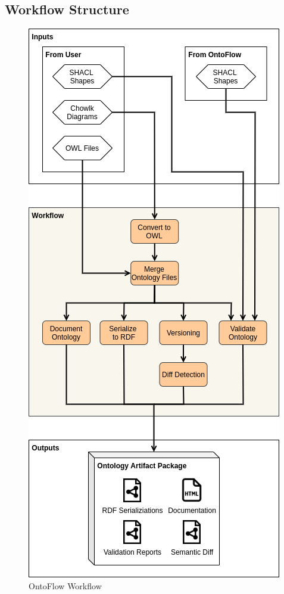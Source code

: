 \documentclass[sigconf]{acmart}
\begin{document}
\subsection{Workflow Structure}

\begin{figure}[ht]
  \centering
  \includegraphics[scale = 0.4]{workflow.png}
  \caption{OntoFlow Workflow}
  \label{fig:workflow}
\end{figure}
\end{document}

